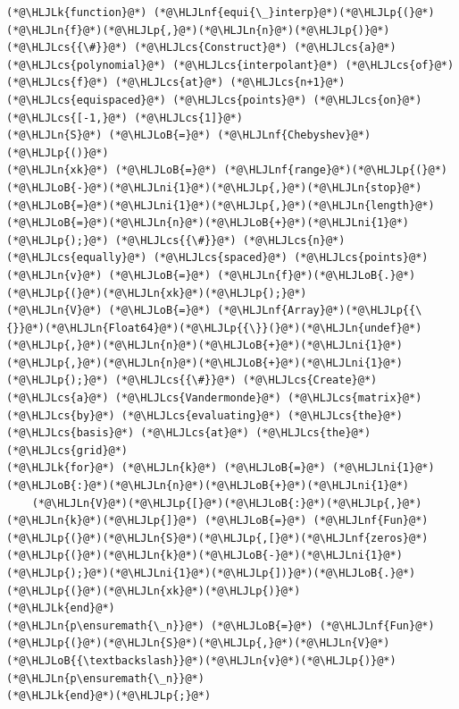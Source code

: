 \documentclass[12pt,a4paper]{article}
\newcommand{\HLJLk}[1]{\textcolor[RGB]{148,91,176}{\textbf{#1}}}
\newcommand{\HLJLn}[1]{#1}
\newcommand{\HLJLnf}[1]{\textcolor[RGB]{66,102,213}{#1}}
\newcommand{\HLJLni}[1]{\textcolor[RGB]{59,151,46}{#1}}
\newcommand{\HLJLoB}[1]{\textcolor[RGB]{102,102,102}{\textbf{#1}}}
\newcommand{\HLJLp}[1]{#1}
\newcommand{\HLJLcs}[1]{\textcolor[RGB]{153,153,119}{\textit{#1}}}
\begin{document}
\begin{lstlisting}
(*@\HLJLk{function}@*) (*@\HLJLnf{equi{\_}interp}@*)(*@\HLJLp{(}@*)(*@\HLJLn{f}@*)(*@\HLJLp{,}@*)(*@\HLJLn{n}@*)(*@\HLJLp{)}@*)
(*@\HLJLcs{{\#}}@*) (*@\HLJLcs{Construct}@*) (*@\HLJLcs{a}@*) (*@\HLJLcs{polynomial}@*) (*@\HLJLcs{interpolant}@*) (*@\HLJLcs{of}@*) (*@\HLJLcs{f}@*) (*@\HLJLcs{at}@*) (*@\HLJLcs{n+1}@*) (*@\HLJLcs{equispaced}@*) (*@\HLJLcs{points}@*) (*@\HLJLcs{on}@*) (*@\HLJLcs{[-1,}@*) (*@\HLJLcs{1]}@*)
(*@\HLJLn{S}@*) (*@\HLJLoB{=}@*) (*@\HLJLnf{Chebyshev}@*)(*@\HLJLp{()}@*)
(*@\HLJLn{xk}@*) (*@\HLJLoB{=}@*) (*@\HLJLnf{range}@*)(*@\HLJLp{(}@*)(*@\HLJLoB{-}@*)(*@\HLJLni{1}@*)(*@\HLJLp{,}@*)(*@\HLJLn{stop}@*)(*@\HLJLoB{=}@*)(*@\HLJLni{1}@*)(*@\HLJLp{,}@*)(*@\HLJLn{length}@*)(*@\HLJLoB{=}@*)(*@\HLJLn{n}@*)(*@\HLJLoB{+}@*)(*@\HLJLni{1}@*)(*@\HLJLp{);}@*) (*@\HLJLcs{{\#}}@*) (*@\HLJLcs{n}@*) (*@\HLJLcs{equally}@*) (*@\HLJLcs{spaced}@*) (*@\HLJLcs{points}@*)
(*@\HLJLn{v}@*) (*@\HLJLoB{=}@*) (*@\HLJLn{f}@*)(*@\HLJLoB{.}@*)(*@\HLJLp{(}@*)(*@\HLJLn{xk}@*)(*@\HLJLp{);}@*)
(*@\HLJLn{V}@*) (*@\HLJLoB{=}@*) (*@\HLJLnf{Array}@*)(*@\HLJLp{{\{}}@*)(*@\HLJLn{Float64}@*)(*@\HLJLp{{\}}(}@*)(*@\HLJLn{undef}@*)(*@\HLJLp{,}@*)(*@\HLJLn{n}@*)(*@\HLJLoB{+}@*)(*@\HLJLni{1}@*)(*@\HLJLp{,}@*)(*@\HLJLn{n}@*)(*@\HLJLoB{+}@*)(*@\HLJLni{1}@*)(*@\HLJLp{);}@*) (*@\HLJLcs{{\#}}@*) (*@\HLJLcs{Create}@*) (*@\HLJLcs{a}@*) (*@\HLJLcs{Vandermonde}@*) (*@\HLJLcs{matrix}@*) (*@\HLJLcs{by}@*) (*@\HLJLcs{evaluating}@*) (*@\HLJLcs{the}@*) (*@\HLJLcs{basis}@*) (*@\HLJLcs{at}@*) (*@\HLJLcs{the}@*) (*@\HLJLcs{grid}@*)
(*@\HLJLk{for}@*) (*@\HLJLn{k}@*) (*@\HLJLoB{=}@*) (*@\HLJLni{1}@*)(*@\HLJLoB{:}@*)(*@\HLJLn{n}@*)(*@\HLJLoB{+}@*)(*@\HLJLni{1}@*)
    (*@\HLJLn{V}@*)(*@\HLJLp{[}@*)(*@\HLJLoB{:}@*)(*@\HLJLp{,}@*)(*@\HLJLn{k}@*)(*@\HLJLp{]}@*) (*@\HLJLoB{=}@*) (*@\HLJLnf{Fun}@*)(*@\HLJLp{(}@*)(*@\HLJLn{S}@*)(*@\HLJLp{,[}@*)(*@\HLJLnf{zeros}@*)(*@\HLJLp{(}@*)(*@\HLJLn{k}@*)(*@\HLJLoB{-}@*)(*@\HLJLni{1}@*)(*@\HLJLp{);}@*)(*@\HLJLni{1}@*)(*@\HLJLp{])}@*)(*@\HLJLoB{.}@*)(*@\HLJLp{(}@*)(*@\HLJLn{xk}@*)(*@\HLJLp{)}@*)
(*@\HLJLk{end}@*)
(*@\HLJLn{p\ensuremath{\_n}}@*) (*@\HLJLoB{=}@*) (*@\HLJLnf{Fun}@*)(*@\HLJLp{(}@*)(*@\HLJLn{S}@*)(*@\HLJLp{,}@*)(*@\HLJLn{V}@*)(*@\HLJLoB{{\textbackslash}}@*)(*@\HLJLn{v}@*)(*@\HLJLp{)}@*)
(*@\HLJLn{p\ensuremath{\_n}}@*)
(*@\HLJLk{end}@*)(*@\HLJLp{;}@*)
\end{lstlisting}
\end{document}
